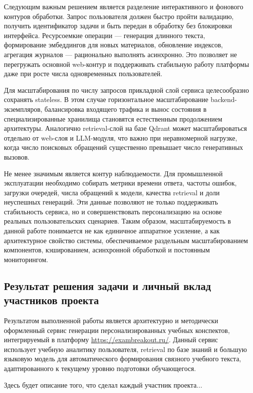 \documentclass[a4paper,12pt]{extarticle}
\begin{document}
Следующим важным решением является разделение интерактивного и фонового контуров обработки. 
Запрос пользователя должен быстро пройти валидацию, получить идентификатор задачи и быть 
передан в обработку без блокировки интерфейса. Ресурсоемкие операции --- генерация 
длинного текста, формирование эмбеддингов для новых материалов, обновление индексов, 
агрегация журналов --- рационально выполнять асинхронно. Это позволяет не перегружать 
основной web-контур и поддерживать стабильную работу платформы даже при росте числа 
одновременных пользователей.

Для масштабирования по числу запросов прикладной слой сервиса целесообразно 
сохранять stateless. В этом случае горизонтальное масштабирование backend-экземпляров, 
балансировка входящего трафика и вынос состояния в специализированные хранилища становятся 
естественным продолжением архитектуры. Аналогично retrieval-слой на базе Qdrant может 
масштабироваться отдельно от web-слоя и LLM-модуля, что важно при неравномерной нагрузке, 
когда число поисковых обращений существенно превышает число генеративных вызовов.

Не менее значимым является контур наблюдаемости. Для промышленной эксплуатации необходимо 
собирать метрики времени ответа, частоты ошибок, загрузки очередей, числа обращений к модели, 
качества retrieval и доли неуспешных генераций. Эти данные позволяют не только поддерживать 
стабильность сервиса, но и совершенствовать персонализацию на основе реальных 
пользовательских сценариев. Таким образом, масштабируемость в данной работе понимается не 
как единичное аппаратное усиление, а как архитектурное свойство системы, обеспечиваемое 
раздельным масштабированием компонентов, кэшированием, асинхронной обработкой и постоянным 
мониторингом.

\subsection{Результат решения задачи и личный вклад участников проекта}

Результатом выполненной работы является архитектурно и методически оформленный сервис 
генерации персонализированных учебных конспектов, интегрируемый в платформу 
\url{https://exambreakout.ru/}. Данный сервис использует учебную аналитику пользователя, 
retrieval по базе знаний и большую языковую модель для автоматического формирования 
связного учебного текста, адаптированного к текущему уровню подготовки обучающегося.

Здесь будет описание того, что сделал каждый участник проекта...
\end{document}
